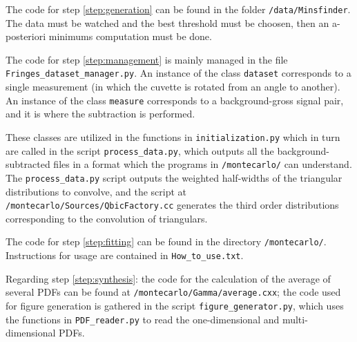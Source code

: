\documentclass[a4paper, 12pt]{article}
\begin{document}
The code for step \ref{step:generation} can be found in the folder \lstinline{/data/Minsfinder}. The data must be watched and the best threshold must be choosen, then an a-posteriori minimums computation must be done.

The code for step \ref{step:management} is mainly managed in the file \lstinline{Fringes_dataset_manager.py}. An instance of the class \lstinline{dataset} corresponds to a single measurement (in which the cuvette is rotated from an angle to another).
An instance of the class \lstinline{measure} corresponds to a background-gross signal pair, and it is where the subtraction is performed.

These classes are utilized in the functions in \lstinline{initialization.py} which in turn are called in the script \lstinline{process_data.py}, which outputs all the background-subtracted files in a format which the programs in \lstinline{/montecarlo/} can understand. The \lstinline{process_data.py} script outputs the weighted half-widths of the triangular distributions to convolve, and the script at \lstinline{/montecarlo/Sources/QbicFactory.cc} generates the third order distributions corresponding to the convolution of triangulars.

The code for step \ref{step:fitting} can be found in the directory \lstinline{/montecarlo/}. Instructions for usage are contained in \lstinline{How_to_use.txt}.

Regarding step \ref{step:synthesis}: the code for the calculation of the average of several PDFs can be found at \lstinline{/montecarlo/Gamma/average.cxx};
the code used for figure generation is gathered in the script \lstinline{figure_generator.py}, which uses the functions in \lstinline{PDF_reader.py} to read the one-dimensional and multi-dimensional PDFs.
\end{document}
